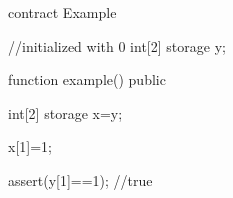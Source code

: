 \begin{soliditybox}
contract Example {
  //initialized with 0
  int[2] storage y;
      
  function example() public {
    int[2] storage x=y;

    x[1]=1;

    assert(y[1]==1); //true
  }
}
\end{soliditybox}